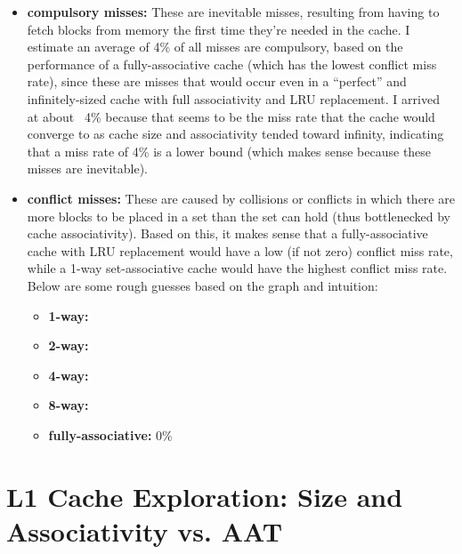 \documentclass{article}
\begin{document}
    \begin{itemize}
        \item \textbf{compulsory misses:} These are inevitable misses, resulting from having to fetch blocks from 
        memory the first time they're needed in the cache. I estimate an average of 4\% of all misses are compulsory, 
        based on the performance of a fully-associative cache (which has the lowest conflict miss rate), since these are misses that would occur even in a ``perfect'' and 
        infinitely-sized cache with full associativity and LRU replacement. I arrived at about ~4\% because that seems 
        to be the miss rate that the cache would converge to as cache size and associativity tended toward infinity, 
        indicating that a miss rate of 4\% is a lower bound (which makes sense because these misses are inevitable).

        \item \textbf{conflict misses:} These are caused by collisions or conflicts in which there are more blocks to 
        be placed in a set than the set can hold (thus bottlenecked by cache associativity). Based on this, it makes sense 
        that a fully-associative cache with LRU replacement would have a low (if not zero) conflict miss rate, while a 1-way 
        set-associative cache would have the highest conflict miss rate. Below are some rough guesses based on the graph 
        and intuition:

        \begin{itemize}
            \item \textbf{1-way:} 
            \item \textbf{2-way:} 
            \item \textbf{4-way:} 
            \item \textbf{8-way:} 
            \item \textbf{fully-associative:} 0\%
        \end{itemize}

    \end{itemize}

    \newpage

    \section{L1 Cache Exploration: Size and Associativity vs. AAT}
\end{document}

